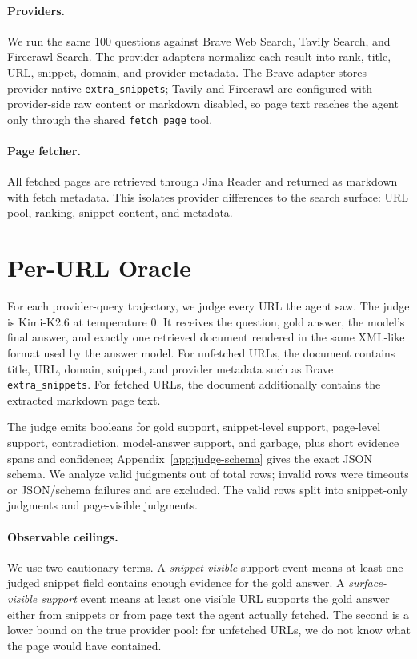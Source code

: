 \documentclass[11pt]{article}
\begin{document}
\paragraph{Providers.} We run the same 100 questions against Brave Web Search, Tavily Search, and Firecrawl Search. The provider adapters normalize each result into rank, title, URL, snippet, domain, and provider metadata. The Brave adapter stores provider-native \texttt{extra\_snippets}; Tavily and Firecrawl are configured with provider-side raw content or markdown disabled, so page text reaches the agent only through the shared \texttt{fetch\_page} tool.

\paragraph{Page fetcher.} All fetched pages are retrieved through Jina Reader and returned as markdown with fetch metadata. This isolates provider differences to the search surface: URL pool, ranking, snippet content, and metadata.

\section{Per-URL Oracle}
\label{sec:oracle}

For each provider-query trajectory, we judge every URL the agent saw. The judge is Kimi-K2.6 at temperature 0. It receives the question, gold answer, the model's final answer, and exactly one retrieved document rendered in the same XML-like format used by the answer model. For unfetched URLs, the document contains title, URL, domain, snippet, and provider metadata such as Brave \texttt{extra\_snippets}. For fetched URLs, the document additionally contains the extracted markdown page text.

The judge emits booleans for gold support, snippet-level support, page-level support, contradiction, model-answer support, and garbage, plus short evidence spans and confidence; Appendix~\ref{app:judge-schema} gives the exact JSON schema. We analyze \NJudgeValid{} valid judgments out of \NJudgeTotal{} total rows; \NJudgeInvalid{} invalid rows were timeouts or JSON/schema failures and are excluded. The valid rows split into \NJudgeSnippetValid{} snippet-only judgments and \NJudgePageValid{} page-visible judgments.

\paragraph{Observable ceilings.} We use two cautionary terms. A \emph{snippet-visible} support event means at least one judged snippet field contains enough evidence for the gold answer. A \emph{surface-visible support} event means at least one visible URL supports the gold answer either from snippets or from page text the agent actually fetched. The second is a lower bound on the true provider pool: for unfetched URLs, we do not know what the page would have contained.
\end{document}
